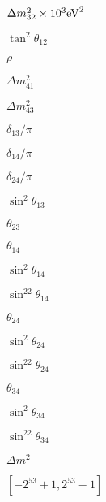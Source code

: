 \documentclass{article}
\begin{document}
$ \Delta m^2_{32}\times10^3{\rm eV}^2 $
\pagebreak

$ \tan^2\theta_{12} $
\pagebreak

$ \rho $
\pagebreak

$ \Delta m^2_{41} $
\pagebreak

$ \Delta m^2_{43} $
\pagebreak

$ \delta_{13}/\pi $
\pagebreak

$ \delta_{14}/\pi $
\pagebreak

$ \delta_{24}/\pi $
\pagebreak

$ \sin^2\theta_{13} $
\pagebreak

$ \theta_{23} $
\pagebreak

$ \theta_{14} $
\pagebreak

$ \sin^2\theta_{14} $
\pagebreak

$ \sin^22\theta_{14} $
\pagebreak

$ \theta_{24} $
\pagebreak

$ \sin^2\theta_{24} $
\pagebreak

$ \sin^22\theta_{24} $
\pagebreak

$ \theta_{34} $
\pagebreak

$ \sin^2\theta_{34} $
\pagebreak

$ \sin^22\theta_{34} $
\pagebreak

$ \Delta m^2 $
\pagebreak

$[-2^{53}+1, 2^{53}-1]$
\pagebreak
\end{document}
